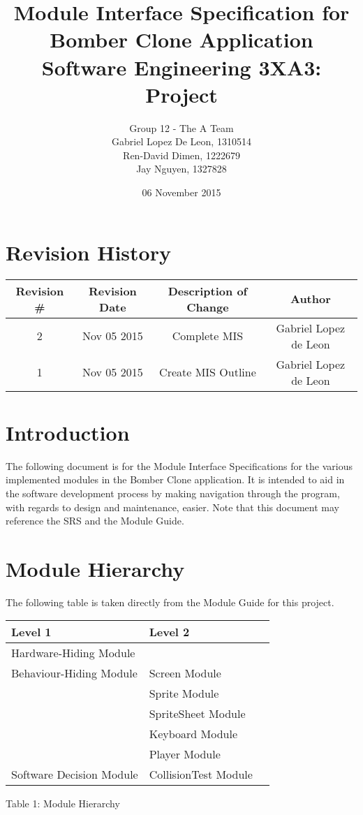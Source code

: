 \documentclass[12pt, letterpaper]{article}
\title{\textbf{Module Interface Specification for Bomber Clone Application \\ \Large Software Engineering 3XA3: Project}}
\author{Group 12 - The A Team \\Gabriel Lopez De Leon, 1310514\\Ren-David Dimen, 1222679\\Jay Nguyen, 1327828}
\date{06 November 2015}
\begin{document}
	
	\begin{titlepage}
		\clearpage\maketitle
		\thispagestyle{empty}
	\end{titlepage}
	
	\newpage
	\tableofcontents
	\newpage
	
	\section{Revision History}
	
	\begin{tabular}{ |c|c|c|c| } 
		\hline
		\textbf{Revision \#} & \textbf{Revision Date} & \textbf{Description of Change} & \textbf{Author}\\
		\hline
		2 & Nov 05 2015 & Complete MIS & Gabriel Lopez de Leon\\
		\hline
		1 & Nov 05 2015 & Create MIS Outline & Gabriel Lopez de Leon\\
		\hline
	\end{tabular}
	
	\newpage
	
	\section{Introduction}
	
	\indent \indent The following document is for the Module Interface Specifications for the various implemented modules in the Bomber Clone application. It is intended to aid in the software development process by making navigation through the program, with regards to design and maintenance, easier. Note that this document may reference the SRS and the Module Guide.
	
	\section{Module Hierarchy}
	
	The following table is taken directly from the Module Guide for this project.
	
		\begin{center}
			\begin{tabular}{ p{6cm} p{4cm} p{4cm}  }
				\hline
				\textbf{Level 1} & \textbf{Level 2} & \\ 
				\hline
				Hardware-Hiding Module \\ 
				\hline 
				Behaviour-Hiding Module & Screen Module &   \\ 
				& Sprite Module & \\
				& SpriteSheet Module & \\
				& Keyboard Module & \\
				& Player Module & \\
				
				\hline
				Software Decision Module & CollisionTest Module &   \\ 
				\hline
				
			\end{tabular}				
			\footnotesize Table 1: Module Hierarchy
		\end{center}
	
\end{document}
